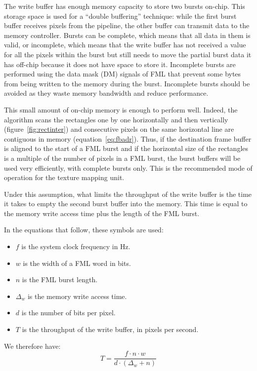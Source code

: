 \documentclass[a4paper,11pt]{kthesis}
\begin{document}
The write buffer has enough memory capacity to store two bursts on-chip. This storage space is used for a ``double buffering'' technique: while the first burst buffer receives pixels from the pipeline, the other buffer can transmit data to the memory controller. Bursts can be complete, which means that all data in them is valid, or incomplete, which means that the write buffer has not received a value for all the pixels within the burst but still needs to move the partial burst data it has off-chip because it does not have space to store it. Incomplete bursts are performed using the data mask (DM) signals of FML that prevent some bytes from being written to the memory during the burst. Incomplete bursts should be avoided as they waste memory bandwidth and reduce performance.

This small amount of on-chip memory is enough to perform well. Indeed, the algorithm scans the rectangles one by one horizontally and then vertically (figure~\ref{fig:rectinter}) and consecutive pixels on the same horizontal line are contiguous in memory (equation~\ref{eq:fbadr}). Thus, if the destination frame buffer is aligned to the start of a FML burst and if the horizontal size of the rectangles is a multiple of the number of pixels in a FML burst, the burst buffers will be used very efficiently, with complete bursts only. This is the recommended mode of operation for the texture mapping unit.

Under this assumption, what limits the throughput of the write buffer is the time it takes to empty the second burst buffer into the memory. This time is equal to the memory write access time plus the length of the FML burst.

In the equations that follow, these symbols are used:
\begin{itemize}
\item $f$ is the system clock frequency in Hz.
\item $w$ is the width of a FML word in bits.
\item $n$ is the FML burst length.
\item $\Delta_{w}$ is the memory write access time.
\item $d$ is the number of bits per pixel.
\item $T$ is the throughput of the write buffer, in pixels per second.
\end{itemize}

We therefore have:
\begin{equation}
T = \frac{f \cdot n \cdot w}{d \cdot (\Delta_{w} + n)}
\end{equation}
\end{document}

